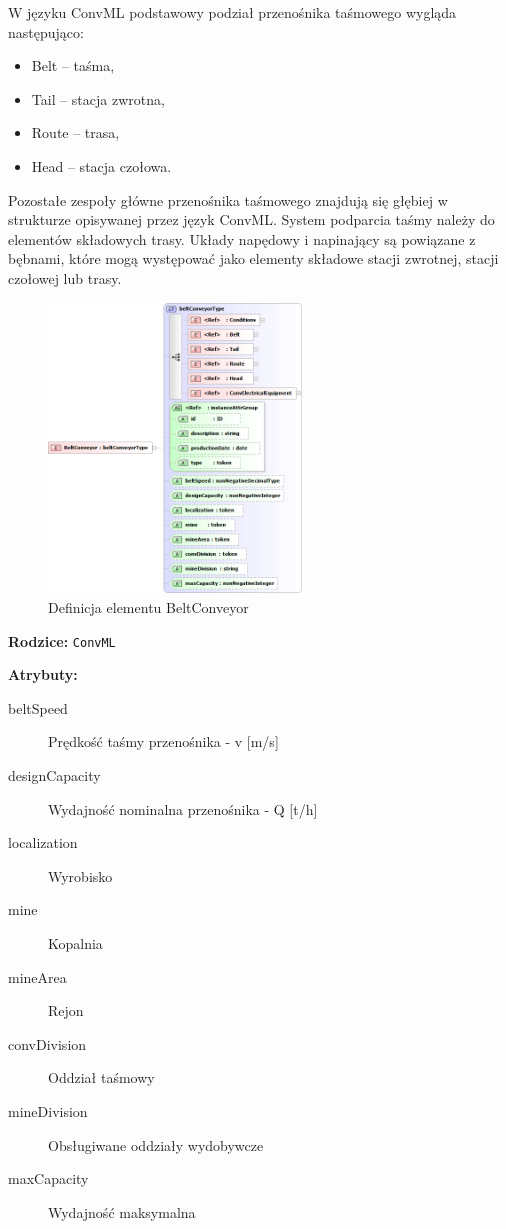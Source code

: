 \documentclass[12pt,a4paper]{article}
\begin{document}
W języku ConvML podstawowy podział przenośnika taśmowego wygląda następująco:

\begin{itemize}
\item Belt -- taśma,
\item Tail -- stacja zwrotna,
\item Route -- trasa,
\item Head -- stacja czołowa.
\end{itemize}

Pozostałe zespoły główne przenośnika taśmowego znajdują się głębiej w strukturze
opisywanej przez język ConvML.  System podparcia taśmy należy do elementów
składowych trasy.  Układy napędowy i napinający są powiązane z bębnami, które
mogą występować jako elementy składowe stacji zwrotnej, stacji czołowej lub
trasy.

\begin{figure}[H]
  \centering
  \includegraphics[width=0.6\textwidth]{png/belt_conveyor_xsd2}
  \caption{Definicja elementu BeltConveyor}
  \label{fig:beltConveyor-xsd}
\end{figure}

\noindent\textbf{Rodzice:} \texttt{ConvML}

\noindent\textbf{Atrybuty:}
\begin{description}
\item[beltSpeed] Prędkość taśmy przenośnika - v [m/s]
\item[designCapacity] Wydajność nominalna przenośnika - Q [t/h]
\item[localization] Wyrobisko
\item[mine] Kopalnia
\item[mineArea] Rejon
\item[convDivision] Oddział taśmowy
\item[mineDivision] Obsługiwane oddziały wydobywcze
\item[maxCapacity] Wydajność maksymalna
\end{description}
\end{document}
